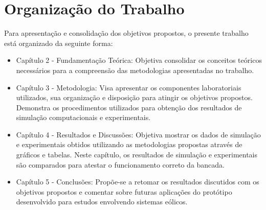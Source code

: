 \section{Organização do Trabalho}

Para apresentação e consolidação dos objetivos propostos, o presente trabalho está organizado da seguinte forma:

\begin{itemize}
	\item Capítulo 2 - Fundamentação Teórica: Objetiva consolidar os conceitos teóricos necessários para a compreensão das metodologias apresentadas no trabalho.
	\item Capítulo 3 - Metodologia: Visa apresentar os componentes laboratoriais utilizados, sua organização e disposição para atingir os objetivos propostos. Demonstra os procedimentos utilizados para obtenção dos resultados de simulação computacionais e experimentais.
	\item Capítulo 4 - Resultados e Discussões: Objetiva mostrar os dados de simulação e experimentais obtidos utilizando as metodologias propostas através de gráficos e tabelas. Neste capítulo, os resultados de simulação e experimentais são comparados para atestar o funcionamento correto da bancada.
	\item Capítulo 5 - Conclusões: Propõe-se a retomar os resultados discutidos com os objetivos propostos e comentar sobre futuras aplicações do protótipo desenvolvido para estudos envolvendo sistemas eólicos.
\end{itemize}